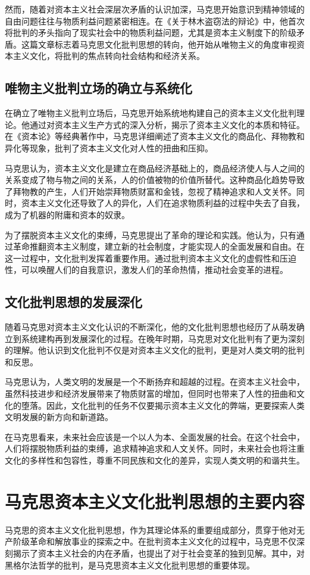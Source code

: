 \documentclass[a4paper]{ctexart}
\begin{document}
然而，随着对资本主义社会深层次矛盾的认识加深，马克思开始意识到精神领域的自由问题往往与物质利益问题紧密相连。在《关于林木盗窃法的辩论》中，他首次将批判的矛头指向了现实社会中的物质利益问题，尤其是资本主义制度下的阶级矛盾。这篇文章标志着马克思文化批判思想的转向，他开始从唯物主义的角度审视资本主义文化，将批判的焦点转向社会结构和经济关系。
\subsection{唯物主义批判立场的确立与系统化}

在确立了唯物主义批判立场后，马克思开始系统地构建自己的资本主义文化批判理论。他通过对资本主义生产方式的深入分析，揭示了资本主义文化的本质和特征。在《资本论》等经典著作中，马克思详细阐述了资本主义文化的商品化、拜物教和异化等现象，批判了资本主义文化对人性的扭曲和压抑。

马克思认为，资本主义文化是建立在商品经济基础上的，商品经济使人与人之间的关系变成了物与物之间的关系，人的价值被物的价值所替代。这种商品化趋势导致了拜物教的产生，人们开始崇拜物质财富和金钱，忽视了精神追求和人文关怀。同时，资本主义文化还导致了人的异化，人们在追求物质利益的过程中失去了自我，成为了机器的附庸和资本的奴隶。

为了摆脱资本主义文化的束缚，马克思提出了革命的理论和实践。他认为，只有通过革命推翻资本主义制度，建立新的社会制度，才能实现人的全面发展和自由。在这一过程中，文化批判发挥着重要作用。通过批判资本主义文化的虚假性和压迫性，可以唤醒人们的自我意识，激发人们的革命热情，推动社会变革的进程。
\subsection{文化批判思想的发展深化}

随着马克思对资本主义文化认识的不断深化，他的文化批判思想也经历了从萌发确立到系统建构再到发展深化的过程。在晚年时期，马克思对文化批判有了更为深刻的理解。他认识到文化批判不仅是对资本主义文化的批判，更是对人类文明的批判和反思。

马克思认为，人类文明的发展是一个不断扬弃和超越的过程。在资本主义社会中，虽然科技进步和经济发展带来了物质财富的增加，但同时也带来了人性的扭曲和文化的堕落。因此，文化批判的任务不仅要揭示资本主义文化的弊端，更要探索人类文明发展的新方向和新道路。

在马克思看来，未来社会应该是一个以人为本、全面发展的社会。在这个社会中，人们将摆脱物质利益的束缚，追求精神追求和人文关怀。同时，未来社会也将注重文化的多样性和包容性，尊重不同民族和文化的差异，实现人类文明的和谐共生。
\newpage
\section{马克思资本主义文化批判思想的主要内容}
马克思的资本主义文化批判思想，作为其理论体系的重要组成部分，贯穿于他对无产阶级革命和解放事业的探索之中。在批判资本主义文化的过程中，马克思不仅深刻揭示了资本主义社会的内在矛盾，也提出了对于社会变革的独到见解。其中，对黑格尔法哲学的批判，是马克思资本主义文化批判思想的重要体现。
\end{document}
